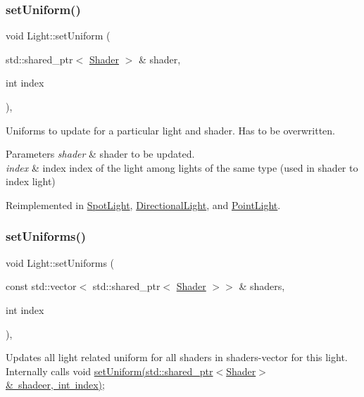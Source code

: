 \subsubsection{\texorpdfstring{setUniform()}{setUniform()}}
{\footnotesize\ttfamily void Light\+::set\+Uniform (\begin{DoxyParamCaption}\item[{std\+::shared\+\_\+ptr$<$ \mbox{\hyperlink{class_shader}{Shader}} $>$ \&}]{shader,  }\item[{int}]{index }\end{DoxyParamCaption})\hspace{0.3cm}{\ttfamily [protected]}, {\ttfamily [virtual]}}

Uniforms to update for a particular light and shader. Has to be overwritten.


\begin{DoxyParams}{Parameters}
{\em shader} & shader to be updated. \\
\hline
{\em index} & index index of the light among lights of the same type (used in shader to index light) \\
\hline
\end{DoxyParams}


Reimplemented in \mbox{\hyperlink{class_spot_light_a7712847acb6f2d61b4c20968cd8ff461}{Spot\+Light}}, \mbox{\hyperlink{class_directional_light_a81d638a84a99683bf260efd871fdf1e2}{Directional\+Light}}, and \mbox{\hyperlink{class_point_light_a846794e557d5820c316f3ace8d2b5003}{Point\+Light}}.

\mbox{\label{class_light_ab1ee3d3938cbd1a29914ae1635155c17}} 
\subsubsection{\texorpdfstring{setUniforms()}{setUniforms()}}
{\footnotesize\ttfamily void Light\+::set\+Uniforms (\begin{DoxyParamCaption}\item[{const std\+::vector$<$ std\+::shared\+\_\+ptr$<$ \mbox{\hyperlink{class_shader}{Shader}} $>$$>$ \&}]{shaders,  }\item[{int}]{index }\end{DoxyParamCaption})\hspace{0.3cm}{\ttfamily [final]}, {\ttfamily [virtual]}}

Updates all light related uniform for all shaders in shaders-\/vector for this light. Internally calls void \mbox{\hyperlink{class_light_a05d202e42ffec4c8bece9c18b4d4541e}{set\+Uniform(std\+::shared\+\_\+ptr$<$\+Shader$>$\& shadeer, int index)}};


